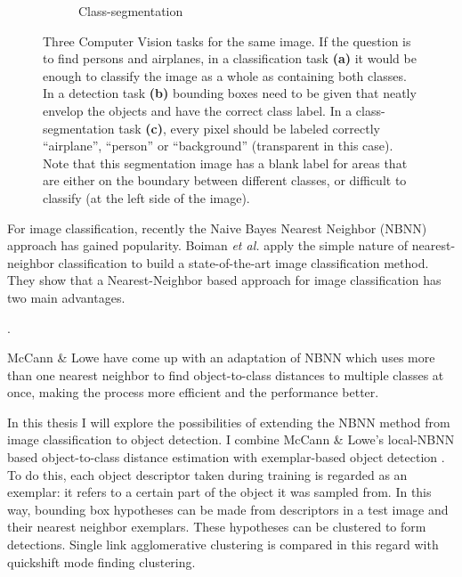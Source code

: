 \begin{figure}[hbt]
\begin{subfigure}[b]{0.3\textwidth}
            \caption{Class-segmentation}
            \label{fig:segmentation}
            \end{subfigure}
    \caption{Three Computer Vision tasks for the same image. If the question is to find persons and airplanes, in a classification task \textbf{(a)} it would be enough to classify the image as a whole as containing both classes. In a detection task \textbf{(b)} bounding boxes need to be given that neatly envelop the objects and have the correct class label. In a class-segmentation task \textbf{(c)}, every pixel should be labeled correctly ``airplane'', ``person'' or ``background'' (transparent in this case). Note that this segmentation image has a blank label for areas that are either on the boundary between different classes, or difficult to classify (at the left side of the image). \cite{pascal-voc-2007}}
    \label{fig:clsdetseg}
\end{figure}

For image classification, recently the Naive Bayes Nearest Neighbor (NBNN) \cite{boiman2008defense} approach has gained popularity. \cite{becker2012codebook, behmo2010towards, mccann2012local, timofte2012iterative, tuytelaars2011nbnn, wang2011improved, zhang2010random} Boiman \emph{et al.} apply the simple nature of nearest-neighbor classification to build a state-of-the-art image classification method. They show that a Nearest-Neighbor based approach for image classification has two main advantages.

.

McCann \& Lowe \cite{mccann2012local} have come up with an adaptation of NBNN which uses more than one nearest neighbor to find object-to-class distances to multiple classes at once, making the process more efficient and the performance better. 

In this thesis I will explore the possibilities of extending the NBNN method from image classification to object detection. I combine McCann \& Lowe's local-NBNN based object-to-class distance estimation with exemplar-based object detection \cite{becker2012codebook, chum2007exemplar}. To do this, each object descriptor taken during training is regarded as an exemplar: it refers to a certain part of the object it was sampled from. In this way, bounding box hypotheses can be made from descriptors in a test image and their nearest neighbor exemplars. These hypotheses can be clustered to form detections. Single link agglomerative clustering is compared in this regard with quickshift mode finding clustering.

